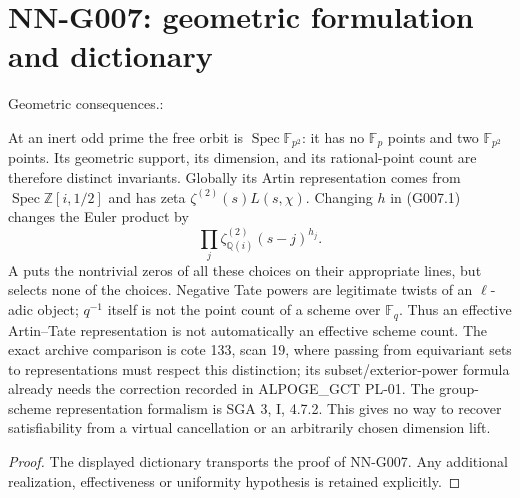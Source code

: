 \section{NN-G007: geometric formulation and dictionary}
\begin{geometricstatement}[NN-G007]
Geometric consequences.:

At an inert odd prime the free orbit is
$\operatorname{Spec}\mathbb F_{p^2}$: it has no $\mathbb F_p$
points and two $\mathbb F_{p^2}$ points. Its geometric support,
its dimension, and its rational-point count are therefore distinct
invariants. Globally its Artin representation comes from
$\operatorname{Spec}\mathbb Z[i,1/2]$ and has zeta
$\zeta^{(2)}(s)L(s,\chi)$.
Changing $h$ in (G007.1) changes the Euler product by
\[
 \prod_j\zeta_{\mathbb Q(i)}^{(2)}(s-j)^{h_j}.
\]
A puts the nontrivial zeros of all these choices on their
appropriate lines, but selects none of the choices. Negative
Tate powers are legitimate twists of an $\ell$-adic object;
$q^{-1}$ itself is not the point count of a scheme over
$\mathbb F_q$. Thus an effective Artin--Tate representation is
not automatically an effective scheme count.
The exact archive comparison is cote 133, scan 19, where passing
from equivariant sets to representations must respect this
distinction; its subset/exterior-power formula already needs the
correction recorded in ALPOGE\_GCT PL-01. The group-scheme
representation formalism is SGA 3, I, 4.7.2. This gives no way to
recover satisfiability from a virtual cancellation or an
arbitrarily chosen dimension lift.


\end{geometricstatement}
\begin{proof} The displayed dictionary transports the proof of NN-G007. Any additional realization, effectiveness or uniformity hypothesis is retained explicitly.\end{proof}


